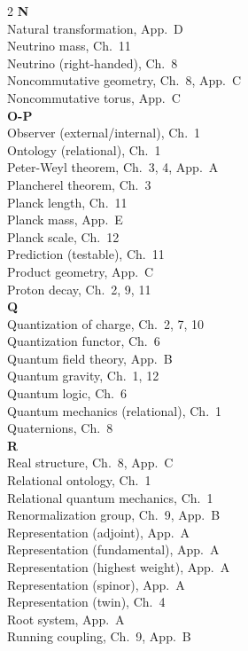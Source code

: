 \documentclass[11pt,a4paper,openright]{book}
\theoremstyle{plain}
\theoremstyle{definition}
\begin{document}
\begin{multicols}{2}
\textbf{N}\\[2pt]
Natural transformation, App.~D\\
Neutrino mass, Ch.~11\\
Neutrino (right-handed), Ch.~8\\
Noncommutative geometry, Ch.~8, App.~C\\
Noncommutative torus, App.~C\\[4pt]

\textbf{O-P}\\[2pt]
Observer (external/internal), Ch.~1\\
Ontology (relational), Ch.~1\\
Peter-Weyl theorem, Ch.~3, 4, App.~A\\
Plancherel theorem, Ch.~3\\
Planck length, Ch.~11\\
Planck mass, App.~E\\
Planck scale, Ch.~12\\
Prediction (testable), Ch.~11\\
Product geometry, App.~C\\
Proton decay, Ch.~2, 9, 11\\[4pt]

\textbf{Q}\\[2pt]
Quantization of charge, Ch.~2, 7, 10\\
Quantization functor, Ch.~6\\
Quantum field theory, App.~B\\
Quantum gravity, Ch.~1, 12\\
Quantum logic, Ch.~6\\
Quantum mechanics (relational), Ch.~1\\
Quaternions, Ch.~8\\[4pt]

\textbf{R}\\[2pt]
Real structure, Ch.~8, App.~C\\
Relational ontology, Ch.~1\\
Relational quantum mechanics, Ch.~1\\
Renormalization group, Ch.~9, App.~B\\
Representation (adjoint), App.~A\\
Representation (fundamental), App.~A\\
Representation (highest weight), App.~A\\
Representation (spinor), App.~A\\
Representation (twin), Ch.~4\\
Root system, App.~A\\
Running coupling, Ch.~9, App.~B\\[4pt]


\end{multicols}
\end{document}
